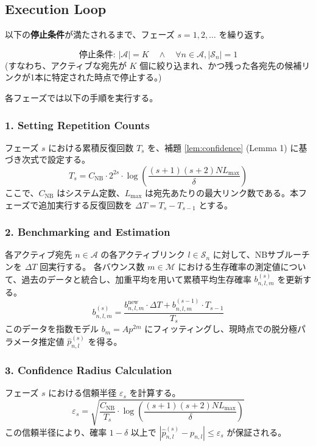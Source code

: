 \documentclass[conference]{IEEEtran}
\begin{document}
\subsection{Execution Loop}

以下の\textbf{停止条件}が満たされるまで、フェーズ $s = 1, 2, \dots$ を繰り返す。

\begin{equation}
    \text{停止条件: } |\mathcal{A}| = K \quad \land \quad \forall n \in \mathcal{A}, |\mathcal{S}_n| = 1
\end{equation}
(すなわち、アクティブな宛先が $K$ 個に絞り込まれ、かつ残った各宛先の候補リンクが1本に特定された時点で停止する。)

各フェーズでは以下の手順を実行する。

\subsubsection{1. Setting Repetition Counts}
フェーズ $s$ における累積反復回数 $T_s$ を、補題 \ref{lem:confidence} (Lemma 1) に基づき次式で設定する。
\begin{equation}
    T_s = C_{\mathrm{NB}} \cdot 2^{2s} \cdot \log\left( \frac{(s+1)(s+2) N L_{\max}}{\delta} \right)
\end{equation}
ここで、$C_{\mathrm{NB}}$ はシステム定数、$L_{\max}$ は宛先あたりの最大リンク数である。本フェーズで追加実行する反復回数を $\Delta T = T_s - T_{s-1}$ とする。

\subsubsection{2. Benchmarking and Estimation}
各アクティブ宛先 $n \in \mathcal{A}$ の各アクティブリンク $l \in \mathcal{S}_n$ に対して、NBサブルーチンを $\Delta T$ 回実行する。
各バウンス数 $m \in \mathcal{M}$ における生存確率の測定値について、過去のデータと統合し、加重平均を用いて累積平均生存確率 $b_{n,l,m}^{(s)}$ を更新する。
\begin{equation}
    b_{n,l,m}^{(s)} = \frac{b_{n,l,m}^{\text{new}} \cdot \Delta T + b_{n,l,m}^{(s-1)} \cdot T_{s-1}}{T_s}
\end{equation}
このデータを指数モデル $b_m = A p^{2m}$ にフィッティングし、現時点での脱分極パラメータ推定値 $\hat{p}_{n,l}^{(s)}$ を得る。

\subsubsection{3. Confidence Radius Calculation}
フェーズ $s$ における信頼半径 $\varepsilon_s$ を計算する。
\begin{equation}
    \varepsilon_s = \sqrt{\frac{C_{\mathrm{NB}}}{T_s} \cdot \log\left( \frac{(s+1)(s+2) N L_{\max}}{\delta} \right)}
\end{equation}
この信頼半径により、確率 $1-\delta$ 以上で $|\hat{p}_{n,l}^{(s)} - p_{n,l}| \le \varepsilon_s$ が保証される。
\end{document}
